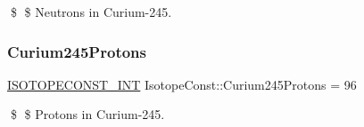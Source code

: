 \$ \$ Neutrons in Curium-\/245. \mbox{\label{group___isotope_const-_curium-_cm245_ga30011cc3835a21a95165c0bff3ac8238}} 
\subsubsection{\texorpdfstring{Curium245\+Protons}{Curium245Protons}}
{\footnotesize\ttfamily \mbox{\hyperlink{group___isotope_const-_macros_ga5f18360b3e99483a35c32d789e62621c}{I\+S\+O\+T\+O\+P\+E\+C\+O\+N\+S\+T\+\_\+\+I\+NT}} Isotope\+Const\+::\+Curium245\+Protons = 96}

\$ \$ Protons in Curium-\/245. 